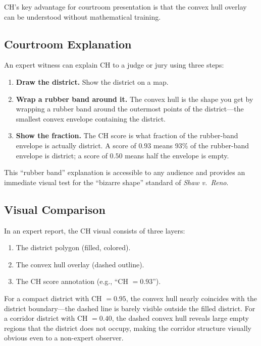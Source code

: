 CH's key advantage for courtroom presentation is that the convex hull overlay
can be understood without mathematical training.

\subsection{Courtroom Explanation}

An expert witness can explain CH to a judge or jury using three steps:
\begin{enumerate}
  \item \textbf{Draw the district.} Show the district on a map.
  \item \textbf{Wrap a rubber band around it.} The convex hull is the shape
    you get by wrapping a rubber band around the outermost points of the district---the
    smallest convex envelope containing the district.
  \item \textbf{Show the fraction.} The CH score is what fraction of the
    rubber-band envelope is actually district. A score of $0.93$ means 93\%
    of the rubber-band envelope is district; a score of $0.50$ means half
    the envelope is empty.
\end{enumerate}

This ``rubber band'' explanation is accessible to any audience and provides
an immediate visual test for the ``bizarre shape'' standard of \textit{Shaw v.\ Reno}.

\subsection{Visual Comparison}

In an expert report, the CH visual consists of three layers:
\begin{enumerate}
  \item The district polygon (filled, colored).
  \item The convex hull overlay (dashed outline).
  \item The CH score annotation (e.g., ``CH $= 0.93$'').
\end{enumerate}

For a compact district with CH $= 0.95$, the convex hull nearly coincides
with the district boundary---the dashed line is barely visible outside the filled district.
For a corridor district with CH $= 0.40$, the dashed convex hull reveals
large empty regions that the district does not occupy, making the corridor
structure visually obvious even to a non-expert observer.

